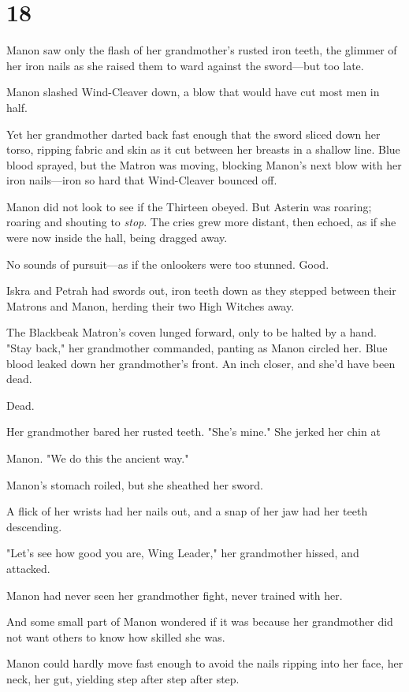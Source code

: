 
\chapter{18}

Manon saw only the flash of her grandmother's rusted iron teeth, the glimmer of her iron nails as she raised them to ward against the sword---but too late.

Manon slashed Wind-Cleaver down, a blow that would have cut most men in half.

Yet her grandmother darted back fast enough that the sword sliced down her torso, ripping fabric and skin as it cut between her breasts in a shallow line. Blue blood sprayed, but the Matron was moving, blocking Manon's next blow with her iron nails---iron so hard that Wind-Cleaver bounced off.

Manon did not look to see if the Thirteen obeyed. But Asterin was roaring; roaring and shouting to \emph{stop}. The cries grew more distant, then echoed, as if she were now inside the hall, being dragged away.

No sounds of pursuit---as if the onlookers were too stunned. Good.

Iskra and Petrah had swords out, iron teeth down as they stepped between their Matrons and Manon, herding their two High Witches away.

The Blackbeak Matron's coven lunged forward, only to be halted by a hand. "Stay back," her grandmother commanded, panting as Manon circled her. Blue blood leaked down her grandmother's front. An inch closer, and she'd have been dead.

Dead.

Her grandmother bared her rusted teeth. "She's mine." She jerked her chin at

Manon. "We do this the ancient way."

Manon's stomach roiled, but she sheathed her sword.

A flick of her wrists had her nails out, and a snap of her jaw had her teeth descending.

"Let's see how good you are, Wing Leader," her grandmother hissed, and attacked.

Manon had never seen her grandmother fight, never trained with her.

And some small part of Manon wondered if it was because her grandmother did not want others to know how skilled she was.

Manon could hardly move fast enough to avoid the nails ripping into her face, her neck, her gut, yielding step after step after step.

